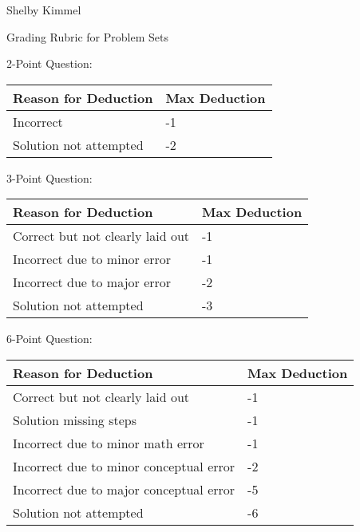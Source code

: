 \documentclass[12pt,landscape]{article}
\begin{document}
\hfill Shelby Kimmel

\begin{center}
{\huge Grading Rubric for Problem Sets}
\end{center}
\bigskip
\begin{multicols}{2}


{\large 2-Point Question:}


{\renewcommand{\arraystretch}{2}
\begin{tabular}{|p{6cm}|p{3.5cm}|}
\hline
{\bf Reason for Deduction}& {\bf Max Deduction}\\
\hline
  Incorrect &-1 \\ 
  Solution not attempted &-2 \\
  \hline
\end{tabular}}

\bigskip\bigskip
{\large 3-Point Question:}


{\renewcommand{\arraystretch}{2}
\begin{tabular}{|p{6cm}|p{3.5cm}|}
\hline
{\bf Reason for Deduction}& {\bf Max Deduction}\\
\hline
  Correct but not clearly laid out &-1 \\  
  Incorrect due to minor error &-1 \\  
  Incorrect due to major error &-2 \\  
  Solution not attempted &-3 \\
  \hline
\end{tabular}}

\vfill

{\large 6-Point Question:}


{\renewcommand{\arraystretch}{2}
\begin{tabular}{|p{6cm}|p{3.5cm}|}
\hline
{\bf Reason for Deduction}& {\bf Max Deduction}\\
\hline
  Correct but not clearly laid out &-1 \\ 
  Solution missing steps &-1 \\  
  Incorrect due to minor math error &-1 \\  
  Incorrect due to minor conceptual error &-2 \\  
  Incorrect due to major conceptual error &-5 \\  
  Solution not attempted &-6 \\
  \hline
\end{tabular}}


\end{multicols}
\end{document}
